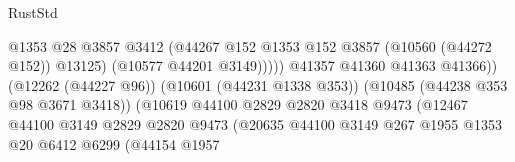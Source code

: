 \begin{lexlean}{RustStd}
\begin{coremodule}
                                                            @1353
                                                            @28
                                                            @3857
                                                            @3412
                                                            (@44267
                                                              @152
                                                              @1353
                                                              @152
                                                              @3857
                                                              (@10560 (@44272 @152))
                                                              @13125)
                                                            (@10577 @44201 @3149)))))
                                                    @41357
                                                    @41360
                                                    @41363
                                                    @41366))
                                                (@12262 (@44227 @96))
                                                (@10601 (@44231 @1338 @353))
                                                (@10485 (@44238 @353 @98 @3671 @3418))
                                                (@10619
                                                  @44100
                                                  @2829
                                                  @2820
                                                  @3418
                                                  @9473
                                                  (@12467
                                                    @44100
                                                    @3149
                                                    @2829
                                                    @2820
                                                    @9473
                                                    (@20635
                                                      @44100
                                                      @3149
                                                      @267
                                                      @1955
                                                      @1353
                                                      @20
                                                      @6412
                                                      @6299
                                                      (@44154
                                                        @1957

\end{coremodule}
\end{lexlean}
